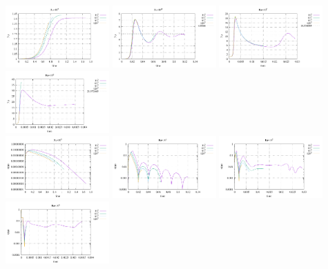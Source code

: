 \begin{center}
\includegraphics[width=3.97cm]{python_codes/fieldstone_155/results/Nu_Ra1e3}
\includegraphics[width=3.97cm]{python_codes/fieldstone_155/results/Nu_Ra1e4}
\includegraphics[width=3.97cm]{python_codes/fieldstone_155/results/Nu_Ra1e5}
\includegraphics[width=3.97cm]{python_codes/fieldstone_155/results/Nu_Ra1e6}
\\
\includegraphics[width=3.97cm]{python_codes/fieldstone_155/results/conv_u_Ra1e3}
\includegraphics[width=3.97cm]{python_codes/fieldstone_155/results/conv_u_Ra1e4}
\includegraphics[width=3.97cm]{python_codes/fieldstone_155/results/conv_u_Ra1e5}
\includegraphics[width=3.97cm]{python_codes/fieldstone_155/results/conv_u_Ra1e6}\\

\end{center}
